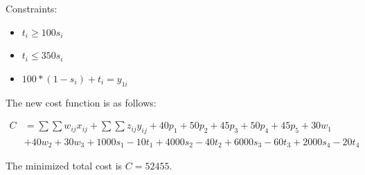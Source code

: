 \documentclass{article}
\begin{document}
Constraints:
\begin{itemize}
    \item $t_i \geq 100s_i$
    \item $t_i \leq 350s_i$
    \item $100*(1-s_i) + t_i = y_{1i}$
\end{itemize}

The new cost function is as follows:

\begin{align*}
    C &= \sum \sum w_{ij} x_{ij} + \sum \sum z_{ij} y_{ij} + 40p_1 + 50p_2 + 45p_3 + 50p_4 + 45p_5 + 30w_1 \\
    & + 40w_2 + 30w_3 + 1000s_1 - 10t_1 + 4000s_2 - 40t_2 + 6000s_3 - 60t_3 + 2000s_4 - 20t_4
\end{align*}

The minimized total cost is $C = 52455$.
\end{document}
